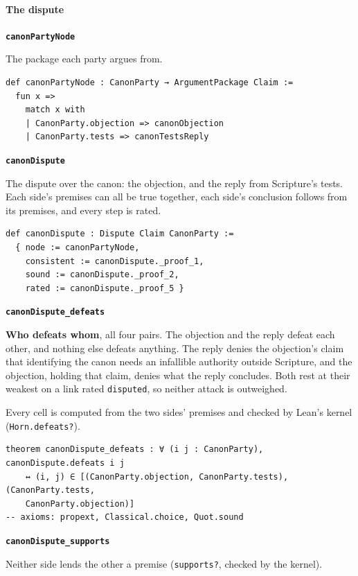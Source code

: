 \documentclass[11pt]{article}
\begin{document}
\paragraph*{The dispute}
\leavevmode\par\nobreak
\par\medskip\noindent\textbf{\texttt{canon\allowbreak{}Party\allowbreak{}Node}}\par\nobreak\noindent
The package each party argues from.

{\small\begin{verbatim}
def canonPartyNode : CanonParty → ArgumentPackage Claim :=
  fun x =>
    match x with
    | CanonParty.objection => canonObjection
    | CanonParty.tests => canonTestsReply
\end{verbatim}}
\par\medskip\noindent\textbf{\texttt{canon\allowbreak{}Dispute}}\par\nobreak\noindent
The dispute over the canon: the objection, and the reply from Scripture’s tests. Each side’s premises can all be true together, each side’s conclusion follows from its premises, and every step is rated.

{\small\begin{verbatim}
def canonDispute : Dispute Claim CanonParty :=
  { node := canonPartyNode,
    consistent := canonDispute._proof_1,
    sound := canonDispute._proof_2,
    rated := canonDispute._proof_5 }
\end{verbatim}}
\par\medskip\noindent\textbf{\texttt{canon\allowbreak{}Dispute\_\allowbreak{}defeats}}\par\nobreak\noindent
\textbf{Who defeats whom}, all four pairs. The objection and the reply defeat each other, and nothing else defeats anything. The reply denies the objection’s claim that identifying the canon needs an infallible authority outside Scripture, and the objection, holding that claim, denies what the reply concludes. Both rest at their weakest on a link rated \texttt{disputed}, so neither attack is outweighed.

Every cell is computed from the two sides’ premises and checked by Lean’s kernel (\texttt{Horn.defeats?}).

{\small\begin{verbatim}
theorem canonDispute_defeats : ∀ (i j : CanonParty), canonDispute.defeats i j
    ↔ (i, j) ∈ [(CanonParty.objection, CanonParty.tests), (CanonParty.tests,
    CanonParty.objection)]
-- axioms: propext, Classical.choice, Quot.sound
\end{verbatim}}
\par\medskip\noindent\textbf{\texttt{canon\allowbreak{}Dispute\_\allowbreak{}supports}}\par\nobreak\noindent
Neither side lends the other a premise (\texttt{supports?}, checked by the kernel).
\end{document}
